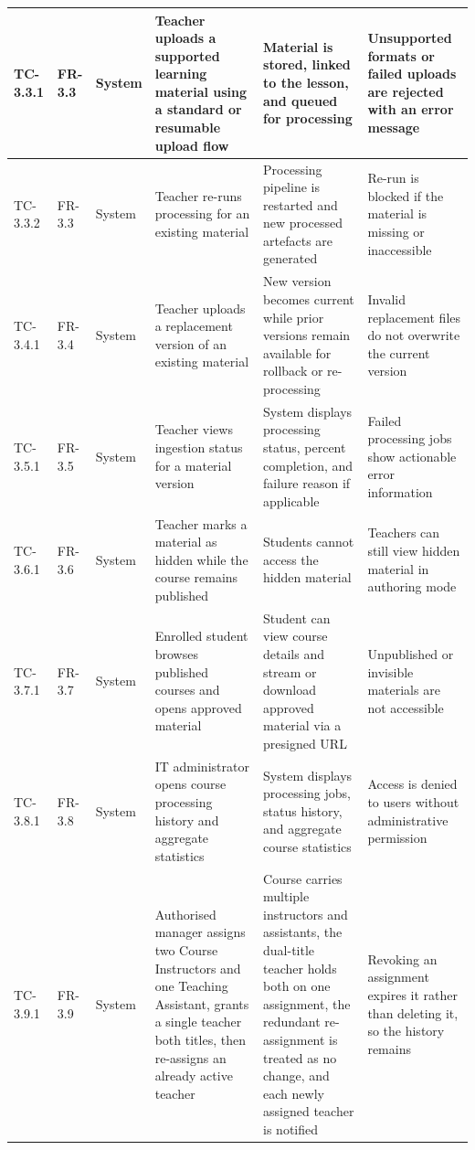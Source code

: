 \begin{longtable}{|>{\centering\arraybackslash}m{}|>{\centering\arraybackslash}m{}|>{\centering\arraybackslash}m{}|m{}|m{}|m{}|}
TC-3.3.1 & FR-3.3 & System & Teacher uploads a supported learning material using a standard or resumable upload flow & Material is stored, linked to the lesson, and queued for processing & Unsupported formats or failed uploads are rejected with an error message \\ \hline
TC-3.3.2 & FR-3.3 & System & Teacher re-runs processing for an existing material & Processing pipeline is restarted and new processed artefacts are generated & Re-run is blocked if the material is missing or inaccessible \\ \hline

TC-3.4.1 & FR-3.4 & System & Teacher uploads a replacement version of an existing material & New version becomes current while prior versions remain available for rollback or re-processing & Invalid replacement files do not overwrite the current version \\ \hline

TC-3.5.1 & FR-3.5 & System & Teacher views ingestion status for a material version & System displays processing status, percent completion, and failure reason if applicable & Failed processing jobs show actionable error information \\ \hline

TC-3.6.1 & FR-3.6 & System & Teacher marks a material as hidden while the course remains published & Students cannot access the hidden material & Teachers can still view hidden material in authoring mode \\ \hline

TC-3.7.1 & FR-3.7 & System & Enrolled student browses published courses and opens approved material & Student can view course details and stream or download approved material via a presigned URL & Unpublished or invisible materials are not accessible \\ \hline

TC-3.8.1 & FR-3.8 & System & IT administrator opens course processing history and aggregate statistics & System displays processing jobs, status history, and aggregate course statistics & Access is denied to users without administrative permission \\ \hline

TC-3.9.1 & FR-3.9 & System & Authorised manager assigns two Course Instructors and one Teaching Assistant, grants a single teacher both titles, then re-assigns an already active teacher & Course carries multiple instructors and assistants, the dual-title teacher holds both on one assignment, the redundant re-assignment is treated as no change, and each newly assigned teacher is notified & Revoking an assignment expires it rather than deleting it, so the history remains \\ \hline


\end{longtable}
